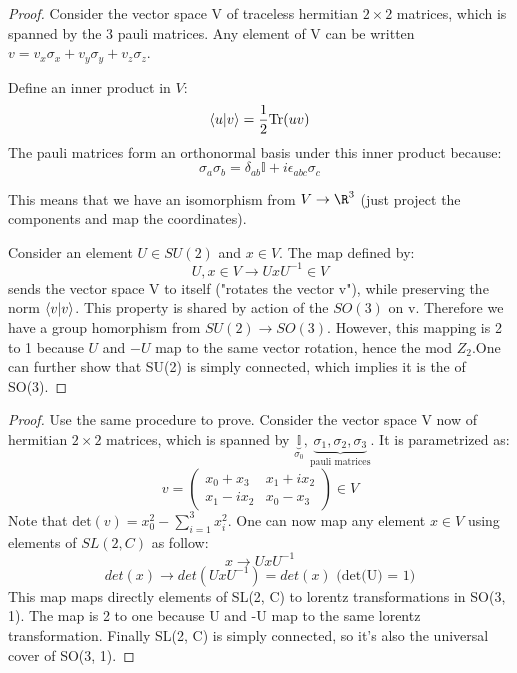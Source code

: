 \documentclass[11pt]{scrartcl}
\begin{document}
\begin{proof}
	Consider the vector space V of traceless hermitian $2 \times 2$ matrices, which is spanned by the 3 pauli matrices.  Any element of V can be written $v = v_x \sigma_x + v_y \sigma_y + v_z \sigma_z$.
	
	Define an inner product in $V$:
	\begin{align}
		\braket{u | v} = \frac12 \mathrm{Tr} (u v)
	\end{align}
	The pauli matrices form an orthonormal basis under this inner product because:
	\[ \sigma_{a} \sigma_{b} = \delta_{ab} \mathbb{I} + i \epsilon_{abc} \sigma_c \]
	
	This means that we have an isomorphism from $V \rightarrow \R^3$ (just project the components and map the coordinates).
	
	Consider an element $U \in SU(2)$ and $x \in V$.  The map defined by:
	\[ U, x \in V \rightarrow U x U^{-1} \in V \]
	sends the vector space V to itself ("rotates the vector v"), while preserving the norm $\braket{v | v}$.  This property is shared by action of the $SO(3)$ on v.
	Therefore we have a group homorphism from $SU(2) \rightarrow SO(3)$.
	However, this mapping is 2 to 1 because $U$ and $-U$ map to the same vector rotation, hence the mod $Z_2$.One can further show that SU(2) is simply connected, which implies it is the  of SO(3).
\end{proof}

\begin{proof}
	Use the same procedure to prove. Consider the vector space V now of 
	hermitian $2 \times 2$ matrices, which is spanned by 
	$\underbrace{\mathbb{I}}_{\sigma_0}, \underbrace{\sigma_1, \sigma_2, \sigma_3}_{\text{pauli matrices}}$.  It is parametrized as:
	\[ v = \left( \begin{array}{cc}
		x_0 + x_3 & x_1 + i x_2 \\
		x_1 - i x_2 & x_0 - x_3
	\end{array} \right)  \in V\]
	Note that $\text{det}(v) = x_0^2 - \sum_{i=1}^3 x_i^2$.
	One can now map any element $x \in V$ using elements of $SL(2,C)$ as follow:
	\[ x \rightarrow U x U^{-1} \]
	\[det(x) \rightarrow det(U x U^{-1}) = det(x)  \text{ (det(U) = 1)} \]
	This map maps directly elements of SL(2, C) to lorentz transformations in SO(3, 1). The map is 2 to one because U and -U map to the same lorentz transformation.  Finally SL(2, C) is simply connected, so it's also the universal cover of SO(3, 1).
\end{proof}
\end{document}
